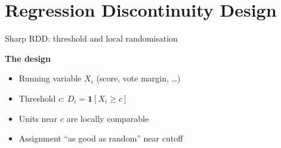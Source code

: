 \documentclass[aspectratio=169, 10pt]{beamer}
\begin{document}
\section{Regression Discontinuity Design}

\begin{frame}{Sharp RDD: threshold and local randomisation}

      \textbf{The design}
      \begin{itemize}
        \item Running variable $X_i$ (score, vote margin, \ldots)
        \item Threshold $c$: $D_i = \mathbf{1}[X_i \geq c]$
        \item Units near $c$ are locally comparable
        \item Assignment ``as good as random'' near cutoff
      \end{itemize}

\end{frame}
\end{document}
